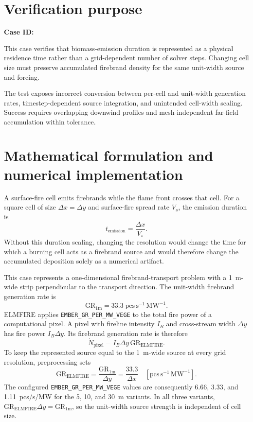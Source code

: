 \section{Verification purpose}

\textbf{Case ID:} \CaseID

This case verifies that biomass-emission duration is represented as a physical residence time rather than a grid-dependent number of solver steps. Changing cell size must preserve accumulated firebrand density for the same unit-width source and forcing.

The test exposes incorrect conversion between per-cell and unit-width generation rates, timestep-dependent source integration, and unintended cell-width scaling. Success requires overlapping downwind profiles and mesh-independent far-field accumulation within tolerance.

\section{Mathematical formulation and numerical implementation}
A surface-fire cell emits firebrands while the flame front crosses that cell.
For a square cell of size $\Delta x=\Delta y$ and surface-fire spread rate
$V_s$, the emission duration is
\[
  t_{\mathrm{emission}}=\frac{\Delta x}{V_s}.
\]
Without this duration scaling, changing the resolution would change the time
for which a burning cell acts as a firebrand source and would therefore change
the accumulated deposition solely as a numerical artifact.

This case represents a one-dimensional firebrand-transport problem with a
1~m-wide strip perpendicular to the transport direction. The unit-width
firebrand generation rate is
\[
  \mathrm{GR}_{1\mathrm{m}}=33.3\;\mathrm{pcs\,s^{-1}\,MW^{-1}}.
\]
ELMFIRE applies \texttt{EMBER\_GR\_PER\_MW\_VEGE} to the total fire power of
a computational pixel. A pixel with fireline intensity $I_B$ and cross-stream
width $\Delta y$ has fire power $I_B\Delta y$. Its firebrand generation rate
is therefore
\[
  \dot N_{\mathrm{pixel}}
  =I_B\Delta y\,\mathrm{GR}_{\mathrm{ELMFIRE}}.
\]
To keep the represented source equal to the 1~m-wide source at every grid
resolution, preprocessing sets
\[
  \mathrm{GR}_{\mathrm{ELMFIRE}}
  =\frac{\mathrm{GR}_{1\mathrm{m}}}{\Delta y}
  =\frac{33.3}{\Delta x}
  \quad [\mathrm{pcs\,s^{-1}\,MW^{-1}}].
\]
The configured \texttt{EMBER\_GR\_PER\_MW\_VEGE} values are consequently
6.66, 3.33, and 1.11~pcs/s/MW for the 5, 10, and 30~m variants. In all three
variants,
$\mathrm{GR}_{\mathrm{ELMFIRE}}\Delta y=\mathrm{GR}_{1\mathrm{m}}$, so the
unit-width source strength is independent of cell size.

